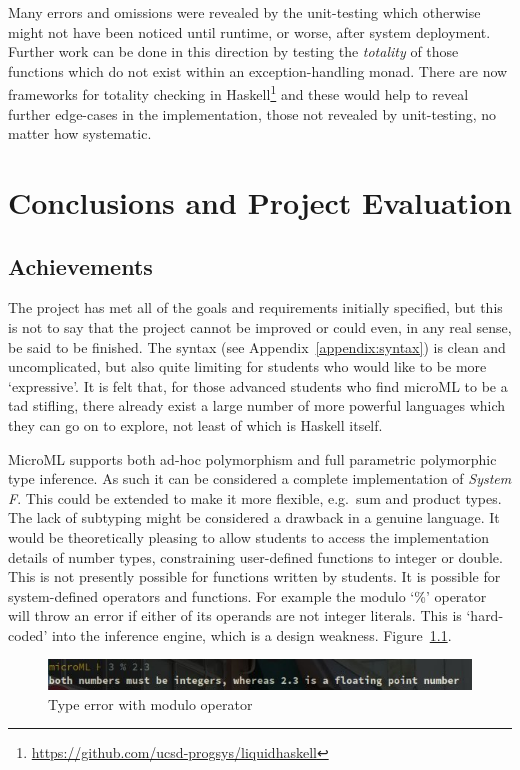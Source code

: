 \documentclass[12pt, a4paper]{report}
\begin{document}
Many errors and omissions were revealed by the unit-testing which otherwise might not have
been noticed until runtime, or worse, after system deployment. Further work can be done
in this direction by testing the \textit{totality} of those functions which do not exist
within an exception-handling monad. There are now frameworks for totality checking in
Haskell\footnote{\url{https://github.com/ucsd-progsys/liquidhaskell}} and these would help to reveal
further edge-cases in the implementation, those not revealed by unit-testing, no matter how
systematic.

\chapter{Conclusions and Project Evaluation}

\section{Achievements}
The project has met all of the goals and requirements initially specified, but this is not to say
that the project cannot be improved or could even, in any real sense, be said to be finished. The
syntax (see Appendix~\ref{appendix:syntax}) is clean and uncomplicated, but also quite limiting for
students who would like to be more `expressive'. It is felt that, for those advanced students who
find microML to be a tad stifling, there already exist a large number of more powerful languages
which they can go on to explore, not least of which is Haskell itself. 

MicroML supports both ad-hoc polymorphism and full parametric polymorphic type inference. As such
it can be considered a complete implementation of \textit{System F}. This could be extended to
make it more flexible, e.g.\ sum and product types. The lack of subtyping might be considered a
drawback in a genuine language. It would be theoretically pleasing to allow students to access the
implementation details of number types, constraining user-defined functions to integer or double.
This is not presently possible for functions written by students. It is possible for
system-defined operators and functions. For example the modulo `\%' operator will throw an error
if either of its operands are not integer literals. This is `hard-coded' into the inference engine,
which is a design weakness. Figure~\ref{fig:modulo}.

\begin{figure}
    \includegraphics[width=\textwidth]{images/modulo.jpg}
    \caption{Type error with modulo operator}
\label{fig:modulo}
\end{figure}
\end{document}
